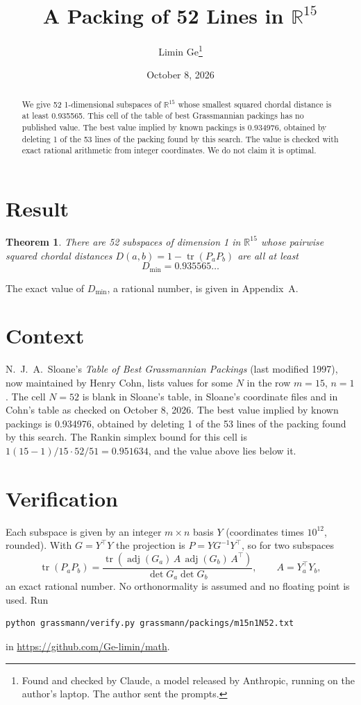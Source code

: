 \documentclass[11pt,a4paper]{article}
\title{A Packing of 52 Lines in $\mathbb{R}^{15}$}
\author{Limin Ge\thanks{Found and checked by Claude, a model released by Anthropic, running on the author's laptop. The author sent the prompts.}}
\date{October 8, 2026}
\newtheorem*{theorem}{Theorem}
\begin{document}
\maketitle
\begin{abstract}
We give 52 1-dimensional subspaces of $\mathbb{R}^{15}$ whose smallest squared chordal distance is at least 0.935565. This cell of the table of best Grassmannian packings has no published value. The best value implied by known packings is 0.934976, obtained by deleting 1 of the 53 lines of the packing found by this search. The value is checked with exact rational arithmetic from integer coordinates. We do not claim it is optimal.
\end{abstract}

\section{Result}
\begin{theorem}
There are 52 subspaces of dimension 1 in $\mathbb{R}^{15}$ whose pairwise squared chordal distances $D(a,b) = 1 - \operatorname{tr}(P_aP_b)$ are all at least
\[ D_{\min} = 0.935565\ldots \]
\end{theorem}
The exact value of $D_{\min}$, a rational number, is given in Appendix~A.


\section{Context}
N.~J.~A.~Sloane's \emph{Table of Best Grassmannian Packings} (last modified 1997), now maintained by Henry Cohn, lists values for some $N$ in the row $m=15$, $n=1$. The cell $N=52$ is blank in Sloane's table, in Sloane's coordinate files and in Cohn's table as checked on October 8, 2026. The best value implied by known packings is 0.934976, obtained by deleting 1 of the 53 lines of the packing found by this search. The Rankin simplex bound for this cell is $1(15-1)/15\cdot 52/51 = 0.951634$, and the value above lies below it.


\section{Verification}
Each subspace is given by an integer $m\times n$ basis $Y$ (coordinates times $10^{12}$, rounded). With $G=Y^\top Y$ the projection is $P=YG^{-1}Y^\top$, so for two subspaces
\[ \operatorname{tr}(P_aP_b)=\frac{\operatorname{tr}(\operatorname{adj}(G_a)\,A\,\operatorname{adj}(G_b)\,A^\top)}{\det G_a\det G_b},\qquad A=Y_a^\top Y_b, \]
an exact rational number. No orthonormality is assumed and no floating point is used. Run
\begin{verbatim}
python grassmann/verify.py grassmann/packings/m15n1N52.txt
\end{verbatim}
in \url{https://github.com/Ge-limin/math}.
\end{document}
